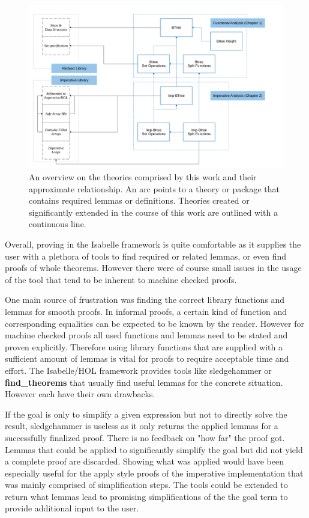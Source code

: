 \begin{figure}
    \centering
    \includegraphics[width=1.1\linewidth]{figures/theories-relationship.pdf}
    \caption[An overview on the theories comprised by this work
    and their approximate relationship.]{
    An overview on the theories comprised by this work
    and their approximate relationship.
    An arc points to a theory or package
    that contains required lemmas or definitions.
    Theories created or significantly extended in the course of this work are outlined with a continuous line.}
    \label{fig:thm-relationships}
\end{figure}

Overall, proving in the Isabelle framework is quite comfortable
as it supplies the user with a plethora of tools
to find required or related lemmas,
or even find proofs of whole theorems.
However there were of course small issues
in the usage of the tool that tend to be 
inherent to machine checked proofs.

One main source of frustration was finding the correct
library functions and lemmas for smooth proofs.
In informal proofs, a certain kind of function and corresponding equalities can be
expected to be known by the reader.
However for machine checked proofs
all used functions and lemmas need to be stated
and proven explicitly.
Therefore using library functions that are supplied
with a sufficient amount of lemmas is vital for proofs
to require acceptable time and effort.
The Isabelle/HOL framework provides tools like sledgehammer
or \textbf{find\_theorems} that usually find useful lemmas for the concrete situation.
However each have their own drawbacks.

If the goal is only to simplify a given expression but not to
directly solve the result, sledgehammer is useless
as it only returns the applied lemmas for a successfully finalized proof.
There is no feedback on "how far" the proof got.
Lemmas that could be applied to significantly simplify the goal
but did not yield a complete proof are discarded.
Showing what was applied
would have been especially useful for the apply style proofs of the
imperative implementation that was mainly comprised of simplification steps.
The tools could be extended to return what lemmas lead to promising
simplifications of the the goal term to provide additional input to the user.

